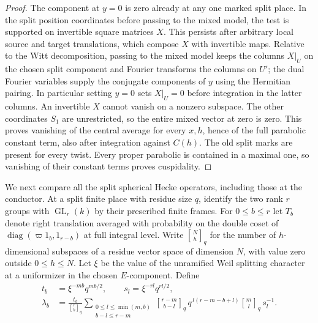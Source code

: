 \documentclass[a4paper,11pt]{article}
\theoremstyle{definition}
\theoremstyle{remark}
\numberwithin{equation}{section}
\begin{document}
\begin{proof}
The component at \(y=0\) is zero already at any one marked
split place. In the split position coordinates before passing
to the mixed model, the test is supported on invertible
square matrices \(X\). This persists after arbitrary local
source and target translations, which compose \(X\) with
invertible maps. Relative to the Witt decomposition, passing
to the mixed model keeps the columns \(X|_U\) on the chosen
split component and Fourier transforms the columns on \(U'\);
the dual Fourier variables supply the conjugate components
of \(y\) using the Hermitian pairing. In particular setting
\(y=0\) sets \(X|_U=0\) before integration in the latter
columns. An invertible \(X\) cannot vanish on a nonzero
subspace. The other coordinates \(S_1\) are unrestricted,
so the entire mixed vector at zero is zero. This proves
vanishing of the central average for every \(x,h\), hence
of the full parabolic constant term, also after integration
against \(C(h)\). The old split marks are present for every
twist. Every proper parabolic is contained in a maximal one,
so vanishing of their constant terms proves cuspidality.
\end{proof}

We next compare all the split spherical Hecke operators,
including those at the conductor. At a split finite place
with residue size \(q\), identify the two rank \(r\) groups
with \(\operatorname{GL}_r(k)\) by their prescribed finite
frames. For \(0\le b\le r\) let \(T_b\) denote right
translation averaged with probability on the double coset of
\(\operatorname{diag}(\varpi 1_b,1_{r-b})\) at full integral
level. Write \({N\brack h}_q\) for the number of
\(h\)-dimensional subspaces of a residue vector space of
dimension \(N\), with value zero outside \(0\le h\le N\).
Let \(\xi\) be the value of the unramified Weil splitting
character at a uniformizer in the chosen \(E\)-component.
Define
\[
 \begin{split}
 t_b&=\xi^{-mb}q^{mb/2},\qquad s_l=\xi^{-rl}q^{rl/2},\\
 \lambda_b&=\frac{t_b}{{r\brack b}_q}
  \sum_{\substack{0\le l\le\min(m,b)\\ b-l\le r-m}}
     {r-m\brack b-l}_q\,q^{\,l(r-m-b+l)}
                       {m\brack l}_q\,s_l^{-1}.
 \end{split}
\]
\end{document}
